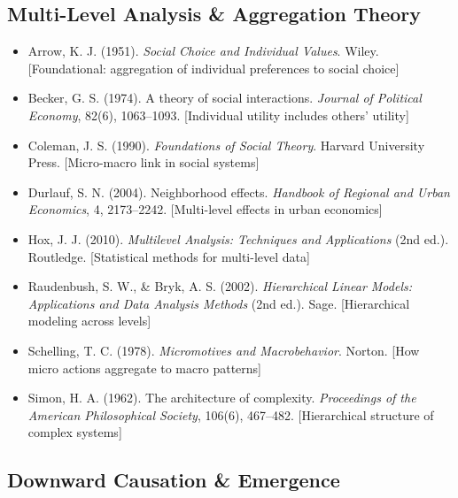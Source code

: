 \subsection*{Multi-Level Analysis \& Aggregation Theory}

\begin{itemize}

\item Arrow, K. J. (1951). 
\textit{Social Choice and Individual Values}. 
Wiley. 
[Foundational: aggregation of individual preferences to social choice]

\item Becker, G. S. (1974). 
A theory of social interactions. 
\textit{Journal of Political Economy}, 82(6), 1063--1093.
[Individual utility includes others' utility]

\item Coleman, J. S. (1990). 
\textit{Foundations of Social Theory}. 
Harvard University Press.
[Micro-macro link in social systems]

\item Durlauf, S. N. (2004). 
Neighborhood effects. 
\textit{Handbook of Regional and Urban Economics}, 4, 2173--2242.
[Multi-level effects in urban economics]

\item Hox, J. J. (2010). 
\textit{Multilevel Analysis: Techniques and Applications} (2nd ed.). 
Routledge.
[Statistical methods for multi-level data]

\item Raudenbush, S. W., \& Bryk, A. S. (2002). 
\textit{Hierarchical Linear Models: Applications and Data Analysis Methods} (2nd ed.). 
Sage.
[Hierarchical modeling across levels]

\item Schelling, T. C. (1978). 
\textit{Micromotives and Macrobehavior}. 
Norton.
[How micro actions aggregate to macro patterns]

\item Simon, H. A. (1962). 
The architecture of complexity. 
\textit{Proceedings of the American Philosophical Society}, 106(6), 467--482.
[Hierarchical structure of complex systems]

\end{itemize}

\subsection*{Downward Causation \& Emergence}

